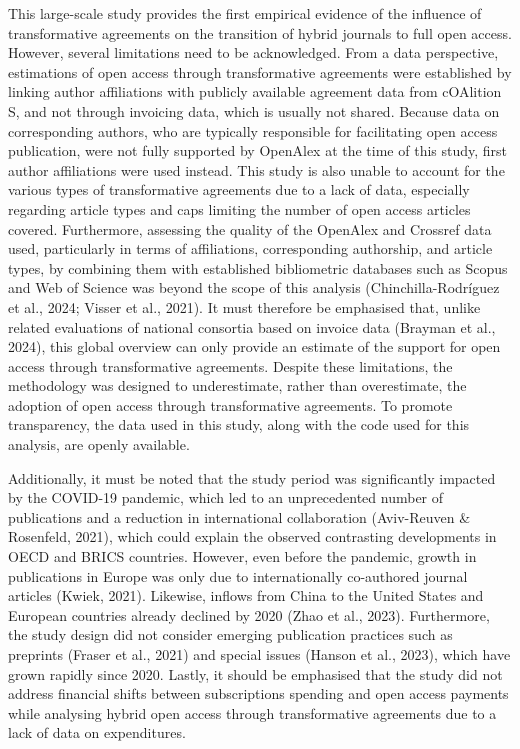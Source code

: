 \documentclass[a4paper,man,floatsintext,longtable,noextraspace,12pt]{apa6}
\begin{document}
This large-scale study provides the first empirical evidence of the
influence of transformative agreements on the transition of hybrid
journals to full open access. However, several limitations need to be
acknowledged. From a data perspective, estimations of open access
through transformative agreements were established by linking author
affiliations with publicly available agreement data from cOAlition S,
and not through invoicing data, which is usually not shared. Because
data on corresponding authors, who are typically responsible for
facilitating open access publication, were not fully supported by
OpenAlex at the time of this study, first author affiliations were used
instead. This study is also unable to account for the various types of
transformative agreements due to a lack of data, especially regarding
article types and caps limiting the number of open access articles
covered. Furthermore, assessing the quality of the OpenAlex and Crossref
data used, particularly in terms of affiliations, corresponding
authorship, and article types, by combining them with established
bibliometric databases such as Scopus and Web of Science was beyond the
scope of this analysis (Chinchilla-Rodríguez et al., 2024; Visser et
al., 2021). It must therefore be emphasised that, unlike related
evaluations of national consortia based on invoice data (Brayman et al.,
2024), this global overview can only provide an estimate of the support
for open access through transformative agreements. Despite these
limitations, the methodology was designed to underestimate, rather than
overestimate, the adoption of open access through transformative
agreements. To promote transparency, the data used in this study, along
with the code used for this analysis, are openly available.

Additionally, it must be noted that the study period was significantly
impacted by the COVID-19 pandemic, which led to an unprecedented number
of publications and a reduction in international collaboration
(Aviv-Reuven \& Rosenfeld, 2021), which could explain the observed
contrasting developments in OECD and BRICS countries. However, even
before the pandemic, growth in publications in Europe was only due to
internationally co-authored journal articles (Kwiek, 2021). Likewise,
inflows from China to the United States and European countries already
declined by 2020 (Zhao et al., 2023). Furthermore, the study design did
not consider emerging publication practices such as preprints (Fraser et
al., 2021) and special issues (Hanson et al., 2023), which have grown
rapidly since 2020. Lastly, it should be emphasised that the study did
not address financial shifts between subscriptions spending and open
access payments while analysing hybrid open access through
transformative agreements due to a lack of data on expenditures.
\end{document}

